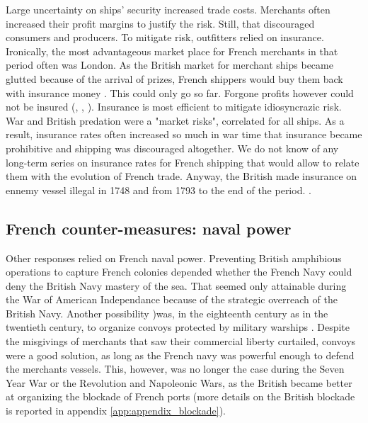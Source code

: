 \documentclass[12pt,a4paper,notitlepage,english]{article}
\begin{document}
Large uncertainty on ships’ security increased trade costs.
Merchants often increased their profit margins to justify the risk.
Still, that discouraged consumers and producers.
To mitigate risk, outfitters relied on insurance.
Ironically, the most advantageous market place for French merchants in that period often was London.
As the British market for merchant ships became glutted because of the arrival of prizes, French shippers would buy them back with insurance money \citep[p. 55]{Tracy1991}. 
This could only go so far.
Forgone profits however could not be insured (\cite[p. 160]{Ducoin1993}, \cite{Villiers1991}, \citep[p. 690-720]{Butel1973}).
Insurance is most efficient to mitigate idiosyncrazic risk.
War and British predation were a "market risks", correlated  for all ships.
As a result, insurance rates often increased so much in war time that insurance became prohibitive and shipping was discouraged altogether.
We do not know of any long-term series on insurance rates for French shipping that would allow to relate them with the evolution of French trade.
Anyway, the British made insurance on ennemy vessel illegal in 1748 and from 1793 to the end of the period. \citep[p.55]{Tracy1991}.

 \subsection{French counter-measures:  naval power}
 
Other responses relied on French naval power.
Preventing British amphibious operations to capture French colonies depended whether the French Navy could deny the British Navy mastery of the sea. 
That seemed only attainable during the War of American Independance because of the strategic overreach of the British Navy. 
Another possibility )was, in the eighteenth century as in the twentieth century, to organize convoys protected by military warships \cite[p. 393, 407, 448, 641]{Villiers1991}.
Despite the misgivings of merchants that saw their commercial liberty curtailed, convoys were a good solution, as long as the French navy was powerful enough to defend the merchants vessels.
This, however, was no longer the case during the Seven Year War or the Revolution and Napoleonic Wars, as the British became better at organizing the blockade of French ports (more details on the British blockade is reported in appendix \ref{app:appendix_blockade}).
\end{document}
